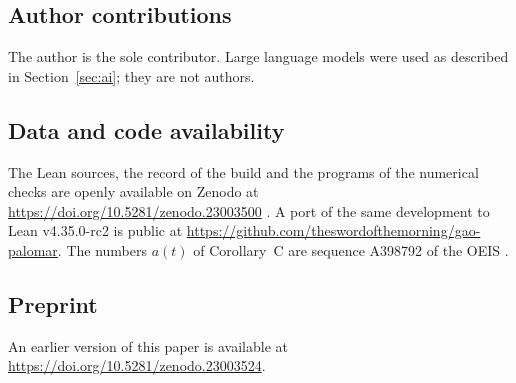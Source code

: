 \documentclass[11pt]{amsart}
\theoremstyle{definition}
\theoremstyle{remark}
\begin{document}
\subsection*{Author contributions}
The author is the sole contributor. Large language models were used as described in Section~\ref{sec:ai}; they are not authors.

\subsection*{Data and code availability}
The Lean sources, the record of the build and the programs of the numerical checks are openly available on Zenodo at \url{https://doi.org/10.5281/zenodo.23003500} \cite{Artifact}. A port of the same development to Lean v4.35.0-rc2 is public at \url{https://github.com/theswordofthemorning/gao-palomar}. The numbers $a(t)$ of Corollary~C are sequence A398792 of the OEIS \cite{OEIS}.

\subsection*{Preprint}
An earlier version of this paper is available at \url{https://doi.org/10.5281/zenodo.23003524}.
\end{document}
